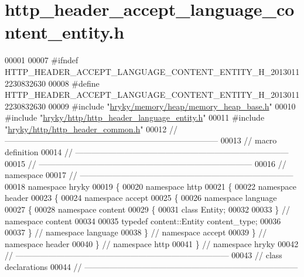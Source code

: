 \hypertarget{http__header__accept__language__content__entity_8h_source}{\section{http\-\_\-header\-\_\-accept\-\_\-language\-\_\-content\-\_\-entity.\-h}
}

\begin{DoxyCode}
00001 
00007 \textcolor{preprocessor}{#ifndef HTTP\_HEADER\_ACCEPT\_LANGUAGE\_CONTENT\_ENTITY\_H\_20130112230832630}
00008 \textcolor{preprocessor}{}\textcolor{preprocessor}{#define HTTP\_HEADER\_ACCEPT\_LANGUAGE\_CONTENT\_ENTITY\_H\_20130112230832630}
00009 \textcolor{preprocessor}{}\textcolor{preprocessor}{#include "\hyperlink{memory__heap__base_8h}{hryky/memory/heap/memory_heap_base.h}"}
00010 \textcolor{preprocessor}{#include "\hyperlink{http__header__language__entity_8h}{hryky/http/http_header_language_entity.h}"}
00011 \textcolor{preprocessor}{#include "\hyperlink{http__header__common_8h}{hryky/http/http_header_common.h}"}
00012 \textcolor{comment}{//
      ------------------------------------------------------------------------------}
00013 \textcolor{comment}{// macro definition}
00014 \textcolor{comment}{//
      ------------------------------------------------------------------------------}
00015 \textcolor{comment}{//
      ------------------------------------------------------------------------------}
00016 \textcolor{comment}{// namespace}
00017 \textcolor{comment}{//
      ------------------------------------------------------------------------------}
00018 \textcolor{keyword}{namespace }hryky
00019 \{
00020 \textcolor{keyword}{namespace }http
00021 \{
00022 \textcolor{keyword}{namespace }header
00023 \{
00024 \textcolor{keyword}{namespace }accept
00025 \{
00026 \textcolor{keyword}{namespace }language
00027 \{
00028 \textcolor{keyword}{namespace }content
00029 \{
00031     \textcolor{keyword}{class }Entity;
00032 
00033 \} \textcolor{comment}{// namespace content}
00034 
00035 \textcolor{keyword}{typedef} content::Entity content\_type;
00036 
00037 \} \textcolor{comment}{// namespace language}
00038 \} \textcolor{comment}{// namespace accept}
00039 \} \textcolor{comment}{// namespace header}
00040 \} \textcolor{comment}{// namespace http}
00041 \} \textcolor{comment}{// namespace hryky}
00042 \textcolor{comment}{//
      ------------------------------------------------------------------------------}
00043 \textcolor{comment}{// class declarations}
00044 \textcolor{comment}{//
      ------------------------------------------------------------------------------}

\end{DoxyCode}
